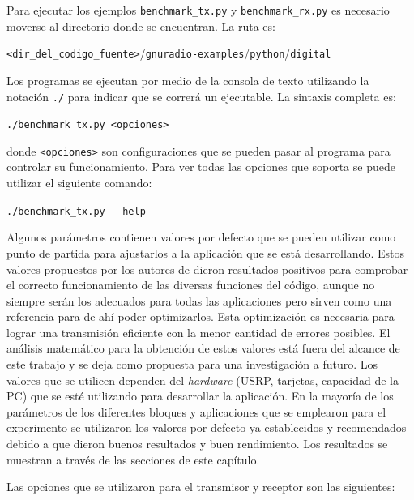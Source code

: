 Para ejecutar los ejemplos \verb|benchmark_tx.py| y \verb|benchmark_rx.py| es necesario moverse al
directorio donde se encuentran. La ruta es:
\begin{center}
\verb|<dir_del_codigo_fuente>|/\verb|gnuradio-examples|/\verb|python|/\verb|digital|
\end{center}
Los programas se ejecutan por medio de la consola de texto utilizando la notaci\'on \verb|./| para
indicar que se correr\'a un ejecutable. La sintaxis completa es:
\begin{center}
\verb|./benchmark_tx.py <opciones>|
\end{center}
donde \verb|<opciones>| son configuraciones que se pueden pasar al programa para controlar su
funcionamiento. Para ver todas las opciones que soporta se puede utilizar el siguiente comando:
\begin{center}
\verb|./benchmark_tx.py --help|
\end{center}

Algunos par\'ametros contienen valores por defecto que se pueden utilizar como punto de partida para ajustarlos a la
aplicaci\'on que se est\'a desarrollando. Estos valores propuestos por los autores de \gnuradio dieron resultados positivos para
comprobar el correcto funcionamiento de las diversas funciones del c\'odigo, aunque no siempre ser\'an los adecuados
para todas las aplicaciones pero sirven como una referencia para de ah\'i poder optimizarlos. Esta optimizaci\'on es necesaria para
lograr una transmisi\'on eficiente con la menor cantidad de errores posibles. El an\'alisis matem\'atico para la obtenci\'on de
estos valores est\'a fuera del alcance de este trabajo y se deja como propuesta para una investigaci\'on a futuro. Los valores que
se utilicen dependen del \emph{hardware} (USRP, tarjetas, capacidad de la PC) que se est\'e utilizando para desarrollar la
aplicaci\'on. En la mayor\'ia de los par\'ametros de los diferentes bloques y aplicaciones que se emplearon para el experimento
se utilizaron los valores por defecto ya establecidos y recomendados debido a que dieron buenos resultados y buen rendimiento.
Los resultados se muestran a trav\'es de las secciones de este cap\'itulo.

Las opciones que se utilizaron para el transmisor y receptor son las siguientes:

